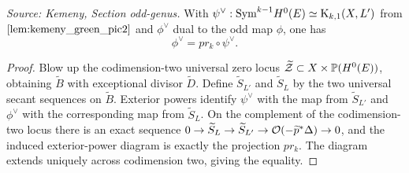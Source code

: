 \begin{lemma}
  \label{lem:kemeny_odd_projection_comparison}
  \textit{Source: Kemeny, Section odd-genus.}
  With \(\psi^\vee:\mathrm{Sym}^{k-1}H^0(E)\simeq\mathrm{K}_{k,1}(X,L')\) from
  \(\cref{lem:kemeny_green_pic2}\) and \(\phi^\vee\) dual to the odd map
  \(\phi\), one has
  \[
    \phi^\vee=pr_k\circ\psi^\vee .
  \]
\end{lemma}
\begin{proof}
  Blow up the codimension-two universal zero locus
  \(\widetilde{\mathcal Z}\subset X\times\mathbb{P}(H^0(E))\), obtaining
  \(\widetilde B\) with exceptional divisor \(\widetilde D\).  Define
  \(\widetilde S_{L'}\) and \(\widetilde S_L\) by the two universal secant
  sequences on \(\widetilde B\).  Exterior powers identify \(\psi^\vee\) with the
  map from \(\widetilde S_{L'}\) and \(\phi^\vee\) with the corresponding map
  from \(\widetilde S_L\).  On the complement of the codimension-two locus there
  is an exact sequence
  \(0\to\widetilde S_L\to\widetilde S_{L'}\to\mathcal{O}(-\widetilde p^*\Delta)\to0\),
  and the induced exterior-power diagram is exactly the projection \(pr_k\).  The
  diagram extends uniquely across codimension two, giving the equality.
\end{proof}

